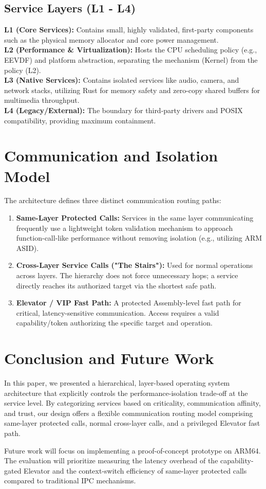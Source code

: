 \documentclass[10pt, a4paper, twocolumn]{article}
\begin{document}
\subsection{Service Layers (L1 - L4)}
\textbf{L1 (Core Services):} Contains small, highly validated, first-party components such as the physical memory allocator and core power management. \\
\textbf{L2 (Performance \& Virtualization):} Hosts the CPU scheduling policy (e.g., EEVDF) and platform abstraction, separating the mechanism (Kernel) from the policy (L2). \\
\textbf{L3 (Native Services):} Contains isolated services like audio, camera, and network stacks, utilizing Rust for memory safety and zero-copy shared buffers for multimedia throughput. \\
\textbf{L4 (Legacy/External):} The boundary for third-party drivers and POSIX compatibility, providing maximum containment.

\section{Communication and Isolation Model}
The architecture defines three distinct communication routing paths:

\begin{enumerate}
    \item \textbf{Same-Layer Protected Calls:} Services in the same layer communicating frequently use a lightweight token validation mechanism to approach function-call-like performance without removing isolation (e.g., utilizing ARM ASID).
    \item \textbf{Cross-Layer Service Calls ("The Stairs"):} Used for normal operations across layers. The hierarchy does not force unnecessary hops; a service directly reaches its authorized target via the shortest safe path.
    \item \textbf{Elevator / VIP Fast Path:} A protected Assembly-level fast path for critical, latency-sensitive communication. Access requires a valid capability/token authorizing the specific target and operation.
\end{enumerate}

\section{Conclusion and Future Work}
In this paper, we presented a hierarchical, layer-based operating system architecture that explicitly controls the performance-isolation trade-off at the service level. By categorizing services based on criticality, communication affinity, and trust, our design offers a flexible communication routing model comprising same-layer protected calls, normal cross-layer calls, and a privileged Elevator fast path. 

Future work will focus on implementing a proof-of-concept prototype on ARM64. The evaluation will prioritize measuring the latency overhead of the capability-gated Elevator and the context-switch efficiency of same-layer protected calls compared to traditional IPC mechanisms.
\end{document}
